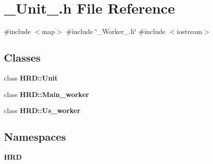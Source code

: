 \section{\+\_\+\+Unit\+\_\+.\+h File Reference}
\label{___unit___8h}
{\ttfamily \#include $<$map$>$}\newline
{\ttfamily \#include \char`\"{}\+\_\+\+Worker\+\_\+.\+h\char`\"{}}\newline
{\ttfamily \#include $<$iostream$>$}\newline
\subsection*{Classes}
\begin{DoxyCompactItemize}
\item 
class \textbf{ H\+R\+D\+::\+Unit}
\item 
class \textbf{ H\+R\+D\+::\+Main\+\_\+worker}
\item 
class \textbf{ H\+R\+D\+::\+Us\+\_\+worker}
\end{DoxyCompactItemize}
\subsection*{Namespaces}
\begin{DoxyCompactItemize}
\item 
 \textbf{ H\+RD}
\end{DoxyCompactItemize}
